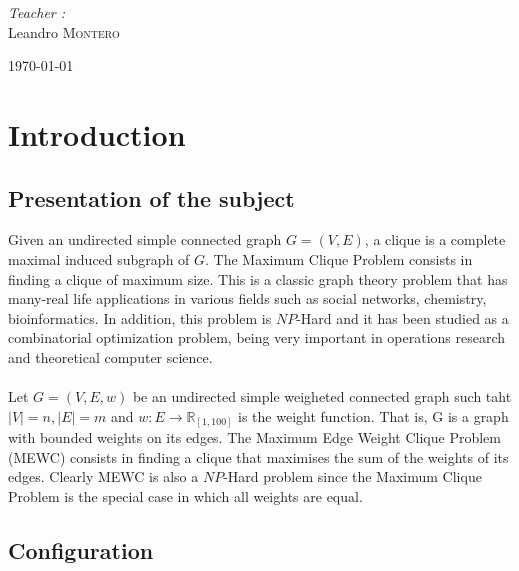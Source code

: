 \documentclass{article}
\begin{document}
\begin{flushleft} \Large
    \emph{Teacher :}\\
    Leandro \textsc{Montero}
\end{flushleft}

\vfill

\begin{center} \Large
    \today
\end{center}

\newpage


\tableofcontents
\newpage


\section{Introduction}

\subsection{Presentation of the subject}

    Given an undirected simple connected graph $G =(V,E)$, a clique is a complete maximal induced subgraph of $G$. The Maximum Clique Problem consists in finding a clique of maximum size. This is a classic graph theory problem that has many-real life applications in various fields such as social networks, chemistry, bioinformatics. In addition, this problem is $NP$-Hard and it has been studied as a combinatorial optimization problem, being very important in operations research and theoretical computer science.
    \\ \\
    Let $G = (V,E,w)$ be an undirected simple weigheted connected graph such taht $|V| = n, |E|=m$ and $w : E \rightarrow \mathbb{R}_{[1,100]}$ is the weight function. That is, G is a graph with bounded weights on its edges. The Maximum Edge Weight Clique Problem (MEWC) consists in finding a clique that maximises the sum of the weights of its edges. Clearly MEWC is also a $NP$-Hard problem since the Maximum Clique Problem is the special case in which all weights are equal.


\subsection{Configuration}
\end{document}
